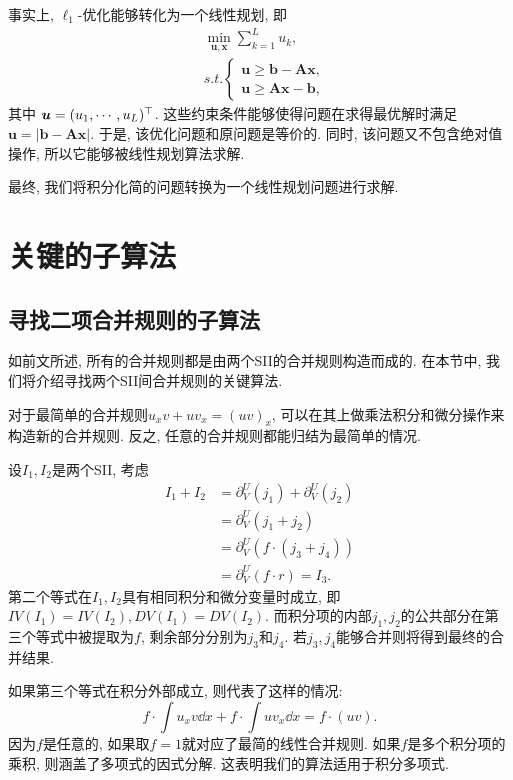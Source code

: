事实上, $\ell_1$-优化能够转化为一个线性规划\cite{L1_regression}, 即
\begin{equation}
\begin{split}
&\underset{\bm u,\bm x}\min \sum_{k=1}^L{u_k},\\
&s.t. \left\{
\begin{matrix}
\bm{u}\ge \bm{b}-\bm{A}\bm{x},\\ 
\bm{u}\ge \bm{A}\bm{x}-\bm{b},
\end{matrix}
\right.
\end{split}
\label{LP}
\end{equation}
其中 $\bm u=(u_1,\cdots,u_L)^\top$. 这些约束条件能够使得问题在求得最优解时满足$\bm u = |\bm{b}-\bm{A}\bm{x}|$. 于是, 该优化问题和原问题是等价的. 同时, 该问题又不包含绝对值操作, 所以它能够被线性规划算法求解. 

最终, 我们将积分化简的问题转换为一个线性规划问题进行求解.

\section{关键的子算法} \label{Details-03}
\subsection{寻找二项合并规则的子算法} \label{Combine-03}
如前文所述, 所有的合并规则都是由两个SII的合并规则构造而成的. 在本节中, 我们将介绍寻找两个SII间合并规则的关键算法. 

对于最简单的合并规则$u_x v + u v_x = (uv)_x$, 可以在其上做乘法\D 积分和微分操作来构造新的合并规则. 反之, 任意的合并规则都能归结为最简单的情况. 

设$I_1,I_2$是两个SII, 考虑 
\begin{equation}
\begin{split}
I_1+I_2 &= \partial^U_V(j_1) + \partial^U_V(j_2) \\
        &= \partial^U_V( j_1+j_2 )\\
        &= \partial^U_V( f\cdot(j_3+j_4) )\\ 
        &= \partial^U_V( f\cdot r ) = I_3 .
\end{split}
\label{combine_form}
\end{equation} 
第二个等式在$I_1,I_2$具有相同积分和微分变量时成立, 即$IV(I_1)=IV(I_2),DV(I_1)=DV(I_2)$. 而积分项的内部$j_1,j_2$的公共部分在第三个等式中被提取为$f$, 剩余部分分别为$j_3$和$j_4$. 若$j_3,j_4$能够合并则将得到最终的合并结果. 

如果第三个等式在积分外部成立, 则代表了这样的情况: 
\begin{equation}
f\cdot\int\!{u_x v\dd x}+f\cdot\int\!{u v_x \dd x} = f\cdot(uv).
\end{equation} 
因为$f$是任意的, 如果取$f=1$就对应了最简的线性合并规则. 如果$f$是多个积分项的乘积, 则涵盖了多项式的因式分解. 这表明我们的算法适用于积分多项式. 

